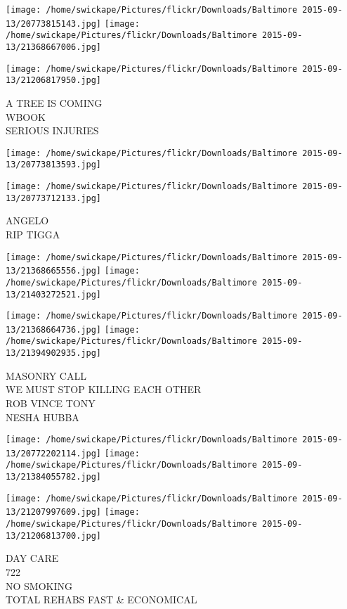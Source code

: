 \documentclass[10pt,letterpaper]{article}
\begin{document}
\texttt{[image: /home/swickape/Pictures/flickr/Downloads/Baltimore 2015-09-13/20773815143.jpg]}
\texttt{[image: /home/swickape/Pictures/flickr/Downloads/Baltimore 2015-09-13/21368667006.jpg]}

\texttt{[image: /home/swickape/Pictures/flickr/Downloads/Baltimore 2015-09-13/21206817950.jpg]}

A TREE IS COMING\\
WBOOK\\
SERIOUS INJURIES\\
\pagebreak

\texttt{[image: /home/swickape/Pictures/flickr/Downloads/Baltimore 2015-09-13/20773813593.jpg]}

\vspace{0.25in}
\texttt{[image: /home/swickape/Pictures/flickr/Downloads/Baltimore 2015-09-13/20773712133.jpg]}

ANGELO\\
RIP TIGGA\\
\pagebreak

\texttt{[image: /home/swickape/Pictures/flickr/Downloads/Baltimore 2015-09-13/21368665556.jpg]}
\texttt{[image: /home/swickape/Pictures/flickr/Downloads/Baltimore 2015-09-13/21403272521.jpg]}

\texttt{[image: /home/swickape/Pictures/flickr/Downloads/Baltimore 2015-09-13/21368664736.jpg]}
\texttt{[image: /home/swickape/Pictures/flickr/Downloads/Baltimore 2015-09-13/21394902935.jpg]}

MASONRY CALL\\
WE MUST STOP KILLING EACH OTHER\\
ROB VINCE TONY\\
NESHA HUBBA\\
\pagebreak

\texttt{[image: /home/swickape/Pictures/flickr/Downloads/Baltimore 2015-09-13/20772202114.jpg]}
\texttt{[image: /home/swickape/Pictures/flickr/Downloads/Baltimore 2015-09-13/21384055782.jpg]}

\texttt{[image: /home/swickape/Pictures/flickr/Downloads/Baltimore 2015-09-13/21207997609.jpg]}
\texttt{[image: /home/swickape/Pictures/flickr/Downloads/Baltimore 2015-09-13/21206813700.jpg]}

DAY CARE\\
722\\
NO SMOKING\\
TOTAL REHABS FAST \& ECONOMICAL\\
\pagebreak
\end{document}
